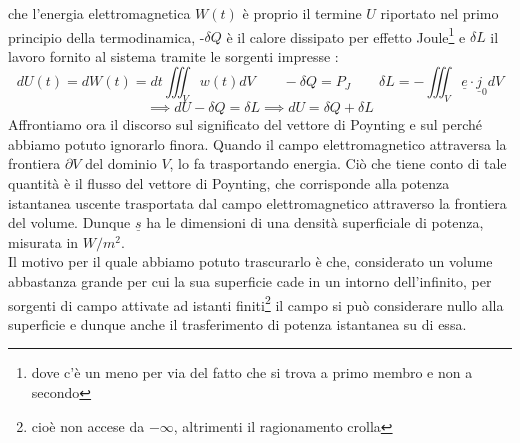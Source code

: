 \documentclass{book}
\begin{document}
        che l'energia elettromagnetica $W(t)$ è proprio il termine $U$ riportato nel primo principio della termodinamica, -$\delta Q$ è il calore dissipato per effetto Joule\footnote{dove c'è un meno per via del fatto che si trova a primo membro e non a secondo}
        e $\delta L$ il lavoro fornito al sistema tramite le sorgenti impresse :
        \begin{equation}
                dU(t) = dW(t) = dt\iiint_{V} w(t)dV \qquad -\delta Q =P_{J}   \qquad \delta L = - \iiint_{V} \underline{e} \cdot \underline{j}_{0}dV
        \end{equation}
        \begin{equation}
            \implies dU-\delta Q = \delta L \implies dU = \delta Q + \delta L
        \end{equation}
    Affrontiamo ora il discorso sul significato del vettore di Poynting e sul perché abbiamo potuto ignorarlo finora.
    Quando il campo elettromagnetico attraversa la frontiera $\partial V$ del dominio $V$, lo fa trasportando energia. Ciò
    che tiene conto di tale quantità è il flusso del vettore di Poynting, che corrisponde alla potenza istantanea uscente
    trasportata dal campo elettromagnetico attraverso la frontiera del volume. Dunque $\underline{s}$ ha le dimensioni
    di una densità superficiale di potenza, misurata in $W/m^{2}$. \\
    Il motivo per il quale abbiamo potuto trascurarlo è che, considerato un volume abbastanza grande per cui
    la sua superficie cade in un intorno dell'infinito, per sorgenti di campo attivate ad istanti finiti\footnote{cioè non accese da $-\infty$, altrimenti
    il ragionamento crolla} il campo si può considerare nullo alla superficie e dunque anche il trasferimento di potenza istantanea su di essa.
\end{document}
